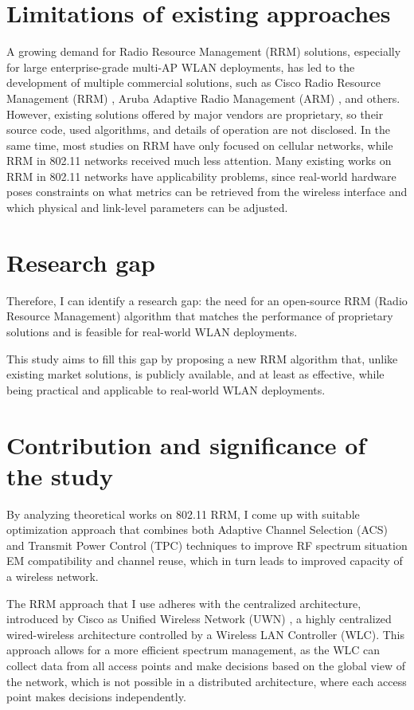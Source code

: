 \section{Limitations of existing approaches}
A growing demand for Radio Resource Management (RRM) solutions, especially for large enterprise-grade multi-AP WLAN deployments, has led to the development of multiple commercial solutions, such as Cisco Radio Resource Management (RRM) \cite{ciscoRadioResourceManagement}, Aruba Adaptive Radio Management (ARM) \cite{UnderstandingARM}, and others. However, existing solutions offered by major vendors are proprietary, so their source code, used algorithms, and details of operation are not disclosed.
In the same time, most studies on RRM have only focused on cellular networks, while RRM in 802.11 networks received much less attention. Many existing works on RRM in 802.11 networks have applicability problems, since real-world hardware poses constraints on what metrics can be retrieved from the wireless interface and which physical and link-level parameters can be adjusted.

\section{Research gap}
Therefore, I can identify a research gap: the need for an open-source RRM (Radio Resource Management) algorithm that matches the performance of proprietary solutions and is feasible for real-world WLAN deployments.

This study aims to fill this gap by proposing a new RRM algorithm that, unlike existing market solutions, is publicly available, and at least as effective, while being practical and applicable to real-world WLAN deployments.

\section{Contribution and significance of the study}
By analyzing theoretical works on 802.11 RRM, I come up with suitable optimization approach that combines both Adaptive Channel Selection (ACS) and Transmit Power Control (TPC) techniques to improve RF spectrum situation EM compatibility and channel reuse, which in turn leads to improved capacity of a wireless network.

The RRM approach that I use adheres with the centralized architecture, introduced by Cisco as Unified Wireless Network (UWN) \cite{CiscoUnifiedWirelessa}, a highly centralized wired-wireless architecture controlled by a Wireless LAN Controller (WLC). This approach allows for a more efficient spectrum management, as the WLC can collect data from all access points and make decisions based on the global view of the network, which is not possible in a distributed architecture, where each access point makes decisions independently.

